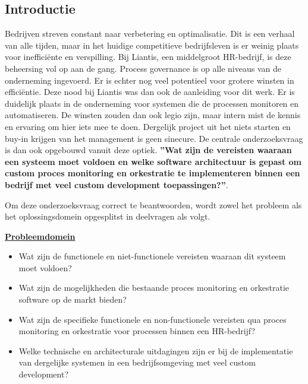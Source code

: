 \documentclass[a0,portrait]{hogent-poster}
\begin{document}
\begin{multicols}{2} %


\section{Introductie}
Bedrijven streven constant naar verbetering en optimalisatie. Dit is een verhaal van alle tijden, maar in het huidige competitieve bedrijfsleven is er weinig plaats voor inefficiënte en verspilling. Bij Liantis, een middelgroot HR-bedrijf, is deze beheersing vol op aan de gang. Process governance is op alle niveaus van de onderneming ingevoerd. Er is echter nog veel potentieel voor grotere winsten in efficiëntie.  Deze nood bij Liantis was dan ook de aanleiding voor dit werk. Er is duidelijk plaats in de onderneming voor systemen die de processen monitoren en automatiseren. De winsten zouden dan ook legio zijn, maar intern mist de kennis en ervaring om hier iets mee te doen. Dergelijk project uit het niets starten en buy-in krijgen van het management is geen sinecure. De centrale onderzoeksvraag is dan ook opgebouwd vanuit deze optiek. \textbf{”Wat zijn de vereisten waaraan een systeem moet voldoen en welke software architectuur is gepast om custom proces monitoring en orkestratie te implementeren binnen een bedrijf met veel custom development toepassingen?”}. \newline

Om deze onderzoeksvraag correct te beantwoorden, wordt zowel het probleem als het oplossingsdomein opgesplitst in deelvragen als volgt.\newline

\underline{\textbf{Probleemdomein}}
\begin{itemize}
  \item Wat zijn de functionele en niet-functionele vereisten waaraan dit systeem moet voldoen?
  \item Wat zijn de mogelijkheden die bestaande proces monitoring en orkestratie software op de markt bieden?
  \item Wat zijn de specifieke functionele en non-functionele vereisten qua proces monitoring en orkestratie voor processen binnen een HR-bedrijf?
  \item Welke technische en architecturale uitdagingen zijn er bij de implementatie van dergelijke systemen in een bedrijfsomgeving met veel custom development?
\end{itemize} \newline


\end{multicols}
\end{document}
